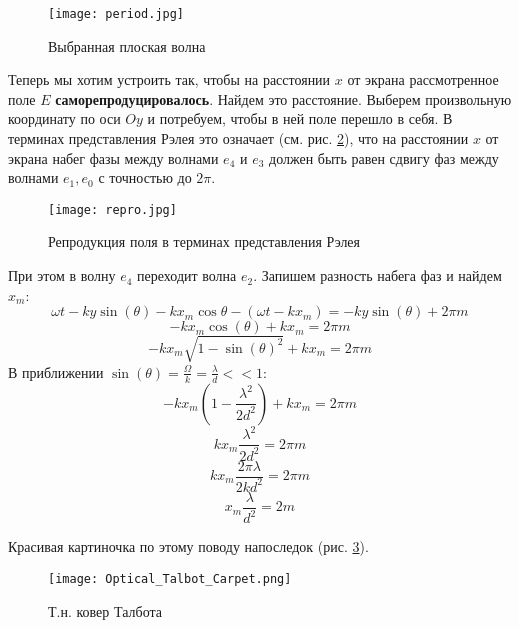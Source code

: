 \begin{figure}[H]
    \centering
    \texttt{[image: period.jpg]}
    \caption{Выбранная плоская волна}
    \label{period}
\end{figure}


Теперь мы хотим устроить так, чтобы  на расстоянии \(x\) от экрана рассмотренное поле \(E\) \textbf{саморепродуцировалось}. Найдем это расстояние. Выберем произвольную координату по оси \(Oy\) и потребуем, чтобы в ней поле перешло в себя. В терминах представления Рэлея это означает (см. рис. \ref{repro}), что на расстоянии \(x\) от экрана набег фазы между волнами \(e_4\) и \(e_3\) должен быть равен сдвигу фаз между волнами \(e_1, e_0\) с точностью до \(2\pi\).


\begin{figure}[h]
    \centering
    \texttt{[image: repro.jpg]}
    \caption{Репродукция поля в терминах представления Рэлея}
    \label{repro}
\end{figure}


При этом в волну \(e_4\) переходит волна \(e_2\). Запишем разность набега фаз и найдем \(x_m\):
\begin{equation}
    \omega t - ky\sin(\theta) - kx_m \cos{\theta} - (\omega t - k x_m) = -ky\sin(\theta) + 2 \pi m
\end{equation}
\begin{equation}
     - kx_m \cos(\theta) + k x_m = 2 \pi m
\end{equation}
\begin{equation}
     - kx_m \sqrt{1 - \sin(\theta)^2} + k x_m = 2 \pi m
\end{equation}
В приближении \(\sin(\theta) = \frac{\Omega}{k} = \frac{\lambda}{d} << 1\):
\begin{equation}
     - kx_m (1 - \frac{\lambda^2}{2d^2}) + k x_m = 2 \pi m
\end{equation}
\begin{equation}
    kx_m\frac{\lambda^2}{2d^2} = 2 \pi m
\end{equation}
\begin{equation}
    kx_m \frac{2\pi \lambda}{2 k d^2} = 2 \pi m
\end{equation}
\begin{equation}
    x_m \frac{\lambda}{d^2} = 2 m
\end{equation}

\begin{center}
\end{center}
Красивая картиночка по этому поводу напоследок (рис. \ref{talbot}).
\begin{figure}[H]
    \centering
    \texttt{[image: Optical\_Talbot\_Carpet.png]}
    \caption{Т.н. ковер Талбота}
    \label{talbot}
\end{figure}


